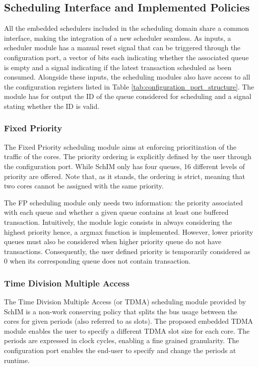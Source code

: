 \subsection{Scheduling Interface and Implemented Policies}
All the embedded schedulers included in the scheduling domain share a
common interface, making the integration of a new scheduler
seamless. As inputs, a scheduler module has a manual reset signal that
can be triggered through the configuration port, a vector of bits each
indicating whether the associated queue is empty and a signal
indicating if the latest transaction scheduled as been
consumed. Alongside these inputs, the scheduling modules also have
access to all the configuration registers listed in Table
\ref{tab:configuration_port_structure}. The module has for output the
ID of the queue considered for scheduling and a signal stating whether
the ID is valid.

\subsubsection{Fixed Priority}
The Fixed Priority scheduling module aims at enforcing prioritization
of the traffic of the cores. The priority ordering is explicitly
defined by the user through the configuration port. While SchIM only
has four queues, 16 different levels of priority are offered. Note
that, as it stands, the ordering is strict, meaning that two cores
cannot be assigned with the same priority.

The FP scheduling module only needs two information: the priority
associated with each queue and whether a given queue contains at least
one buffered transaction. Intuitively, the module logic consists in
always considering the highest priority hence, a argmax function is
implemented. However, lower priority queues must also be considered
when higher priority queue do not have transactions. Consequently, the
user defined priority is temporarily considered as 0 when its
corresponding queue does not contain transaction.

\subsubsection{Time Division Multiple Access}
The Time Division Multiple Access (or TDMA) scheduling module provided
by SchIM is a non-work conserving policy that splits the bus usage
between the cores for given periods (also referred to as slots). The
proposed embedded TDMA module enables the user to specify a different
TDMA slot size for each core. The periods are expressed in clock
cycles, enabling a fine grained granularity. The configuration port
enables the end-user to specify and change the periods at runtime.

